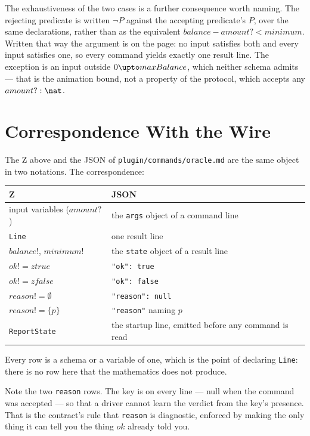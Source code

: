 \documentclass[a4paper,10pt,fleqn]{article}
\begin{document}
The exhaustiveness of the two cases is a further consequence worth
naming. The rejecting predicate is written $\lnot P$ against the
accepting predicate's $P$, over the same declarations, rather than as the
equivalent $balance - amount? < minimum$. Written that way the argument
is on the page: no input satisfies both and every input satisfies one, so
every command yields exactly one result line. The exception is an input
outside $0 \upto maxBalance$, which neither schema admits --- that is the
animation bound, not a property of the protocol, which accepts any
$amount? : \nat$.

\section{Correspondence With the Wire}

The Z above and the JSON of \texttt{plugin/commands/oracle.md} are the same
object in two notations. The correspondence:

\begin{center}
\begin{tabular}{ll}
  \textbf{Z} & \textbf{JSON} \\
  \hline
  input variables ($amount?$)   & the \texttt{args} object of a command line \\
  \texttt{Line}                 & one result line \\
  $balance!$, $minimum!$        & the \texttt{state} object of a result line \\
  $ok! = ztrue$                 & \texttt{"ok": true} \\
  $ok! = zfalse$                & \texttt{"ok": false} \\
  $reason! = \emptyset$         & \texttt{"reason": null} \\
  $reason! = \{ p \}$           & \texttt{"reason"} naming $p$ \\
  \texttt{ReportState}          & the startup line, emitted before any command is read \\
\end{tabular}
\end{center}

Every row is a schema or a variable of one, which is the point of
declaring \texttt{Line}: there is no row here that the mathematics does
not produce.

Note the two \texttt{reason} rows. The key is on every line --- null when
the command was accepted --- so that a driver cannot learn the verdict
from the key's presence. That is the contract's rule that \texttt{reason}
is diagnostic, enforced by making the only thing it can tell you the
thing $ok$ already told you.
\end{document}
